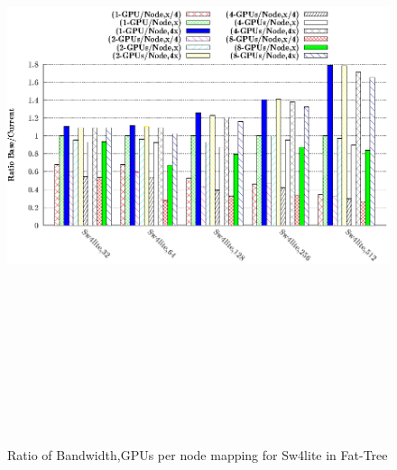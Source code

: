 \documentclass[final]{beamer}
\newlength{\onecolwid}
\newlength{\twocolwid}
\begin{document}
\begin{frame}[t]
\begin{columns}[t]
\begin{column}{\twocolwid}
\begin{columns}[t,totalwidth=\twocolwid]
\begin{column}{\onecolwid}
\begin{figure}
\begin{minipage}{1\textwidth}
\includegraphics[width=1\linewidth, height=18cm]{figs/ftree-bw-mapping-comp-sw4lite.eps}
\captionsetup{labelformat=empty}
\caption{Ratio of Bandwidth,GPUs per node mapping for Sw4lite in Fat-Tree}
\end{minipage}
\end{figure}



\end{column}
\end{columns}
\end{column}
\end{columns}
\end{frame}
\end{document}
